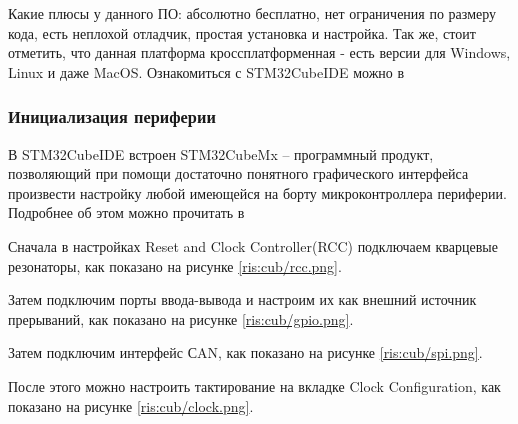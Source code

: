 \begin{sloppypar}
Какие плюсы у данного ПО: абсолютно бесплатно, нет ограничения по размеру кода, есть неплохой отладчик, простая установка и настройка. Так же, стоит отметить, что данная платформа кроссплатформенная - есть версии для Windows, Linux и даже MacOS. Ознакомиться с STM32CubeIDE можно в \cite{STM32CubeIDE}

\subsubsection{Инициализация периферии}
В STM32CubeIDE встроен STM32CubeMx -- программный продукт, позволяющий при помощи достаточно понятного графического интерфейса произвести настройку любой имеющейся на борту микроконтроллера периферии. Подробнее об этом можно прочитать в \cite{cube}

Сначала в настройках Reset and Clock Controller(RCC) подключаем кварцевые резонаторы, как показано на рисунке \ref{ris:cub/rcc.png}.

Затем подключим порты ввода-вывода и настроим их как внешний источник прерываний, как показано на рисунке \ref{ris:cub/gpio.png}.

Затем подключим интерфейс СAN, как показано на рисунке \ref{ris:cub/spi.png}.

После этого можно настроить тактирование на вкладке Clock Configuration, как показано на рисунке \ref{ris:cub/clock.png}.

\end{sloppypar}
